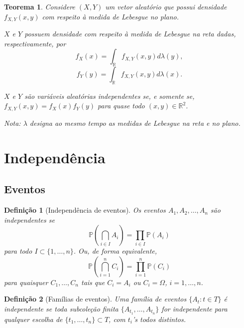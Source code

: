 \documentclass[12pt,a4paper,answers]{article}
\numberwithin{equation}{section} %
\renewcommand{\P}{\mathbb{P}}
\theoremstyle{thm_estilo}
\newtheorem{theorem}{Teorema}[section]
\newtheorem{definition}{Definição}[section]
\theoremstyle{thm_note_est}
\begin{document}
\begin{theorem}
	Considere $(X, Y)$ um vetor aleatório que possui densidade $f_{X,Y}(x, y)$ com respeito à medida de Lebesgue no plano.
	
	\begin{outline}
		\1[(a)] $X$ e $Y$ possuem densidade com respeito à medida de Lebesgue na reta dadas, respectivamente, por
		\begin{equation}
			f_X(x) = \int_{\mathbb{R}} f_{X,Y}(x, y)d\lambda(y),
		\end{equation}
		\begin{equation}
			f_Y(y) = \int_{\mathbb{R}} f_{X,Y}(x, y)d\lambda(x).
		\end{equation}
		
		\1[(b)] $X$ e $Y$ são variáveis aleatórias independentes se, e somente se, $f_{X,Y}(x, y) = f_X(x)f_Y(y)$ para quase todo $(x, y) \in \mathbb{R}^2$.
	\end{outline}
	
	\textit{Nota:} $\lambda$ designa ao mesmo tempo as medidas de Lebesgue na reta e no plano.
\end{theorem}

\section{Independência}

\subsection{Eventos}

\begin{definition}[Independência de eventos]
	Os eventos $A_1, A_2, \ldots, A_n$ são independentes se
	\begin{equation}
		\P\left(\bigcap_{i\in I}A_i \right) = \prod_{i\in I} \P (A_i)
	\end{equation}
	para todo $I \subset \{1,\ldots,n\}$. Ou, de forma equivalente,
	\begin{equation}
		\P\left(\bigcap_{i=1}^nC_i \right) = \prod_{i=1}^n \P (C_i)
	\end{equation}
	para quaisquer $C_1, \ldots, C_n$ tais que $C_i=A_i$ ou $C_i=\Omega$, $i=1,\ldots, n$.
\end{definition}

\begin{definition}[Famílias de eventos]
	Uma família de eventos $\{A_t: t \in T\}$ é independente se toda subcoleção finita $\{A_{t_1}, \ldots, A_{t_n}\}$ for independente para qualquer escolha de $\{t_1, \ldots, t_n\}\subset T$, com $t_i$'s todos distintos.
\end{definition}
\end{document}
